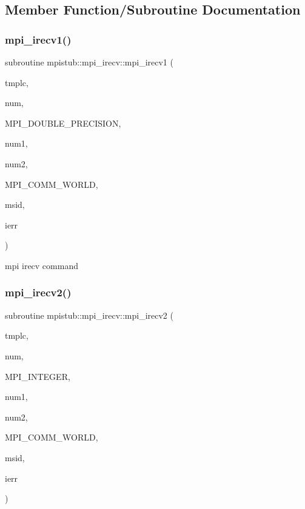 \subsection{Member Function/\+Subroutine Documentation}
\mbox{\label{interfacempistub_1_1mpi__irecv_aabcc66e35e1bbe27613d8e70471d0aab}} 
\subsubsection{\texorpdfstring{mpi\_irecv1()}{mpi\_irecv1()}}
{\footnotesize\ttfamily subroutine mpistub\+::mpi\+\_\+irecv\+::mpi\+\_\+irecv1 (\begin{DoxyParamCaption}\item[{double precision}]{tmplc,  }\item[{}]{num,  }\item[{}]{M\+P\+I\+\_\+\+D\+O\+U\+B\+L\+E\+\_\+\+P\+R\+E\+C\+I\+S\+I\+ON,  }\item[{}]{num1,  }\item[{}]{num2,  }\item[{}]{M\+P\+I\+\_\+\+C\+O\+M\+M\+\_\+\+W\+O\+R\+LD,  }\item[{}]{msid,  }\item[{}]{ierr }\end{DoxyParamCaption})}



mpi irecv command 

\mbox{\label{interfacempistub_1_1mpi__irecv_a177554c6bb9e41e16d6e89339a73f6dd}} 
\subsubsection{\texorpdfstring{mpi\_irecv2()}{mpi\_irecv2()}}
{\footnotesize\ttfamily subroutine mpistub\+::mpi\+\_\+irecv\+::mpi\+\_\+irecv2 (\begin{DoxyParamCaption}\item[{integer}]{tmplc,  }\item[{}]{num,  }\item[{}]{M\+P\+I\+\_\+\+I\+N\+T\+E\+G\+ER,  }\item[{}]{num1,  }\item[{}]{num2,  }\item[{}]{M\+P\+I\+\_\+\+C\+O\+M\+M\+\_\+\+W\+O\+R\+LD,  }\item[{}]{msid,  }\item[{}]{ierr }\end{DoxyParamCaption})}

